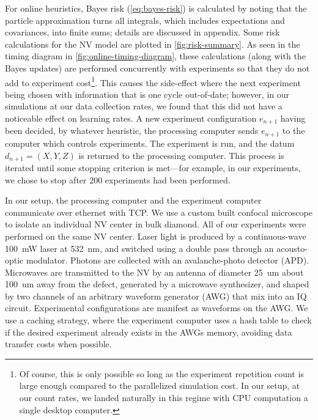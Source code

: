 \documentclass[aps,nofootinbib,twocolumn,superscriptaddress]{revtex4}
\newcommand{\eps}{e}
\newcommand{\data}{d}
\begin{document}
For online heuristics, Bayes risk (\autoref{eq:bayes-risk}) 
is calculated by noting that the 
particle approximation turns all integrals, which includes
expectations and covariances, into finite sums;
details are discussed in appendix\TODO.
Some risk calculations for the NV model 
are plotted in \autoref{fig:risk-summary}.
As seen in the timing diagram in \autoref{fig:online-timing-diagram}, these 
calculations (along with the Bayes updates) are
performed concurrently with experiments so that they do not 
add to experiment cost\footnote{Of course, this is only
possible so long as the experiment repetition count is large 
enough compared to the parallelized simulation cost. In our setup, at
our count rates, we landed naturally in this regime with
CPU computation a single desktop computer.}.
This causes the side-effect where the next experiment being chosen with
information that is one cycle out-of-date; however,
in our simulations at our data collection rates,
we found that this did not have a noticeable
effect on learning rates.
A new experiment configuration $\eps_{n+1}$ having been 
decided, by whatever heuristic, 
the processing computer sends $\eps_{n+1}$ to the 
computer which controls experiments.
The experiment is run, and the datum $\data_{n+1}=(X,Y,Z)$
is returned to the processing computer.
This process is iterated until some stopping criterion is met---for
example, in our experiments, we chose to 
stop after 200 experiments had been performed.

In our setup, the processing computer and the experiment
computer communicate over ethernet with TCP.
We use a custom built confocal microscope to isolate an individual
NV center in bulk diamond.
All of our experiments were performed on the same NV center.
Laser light is produced by a continuous-wave \SI{100}{mW} laser
at \SI{532}{nm}, and switched using a double pass through an
acousto-optic modulator. %
Photons are collected with an avalanche-photo detector
(APD).%
Microwaves are transmitted to the NV by an antenna of 
diameter \SI{25}{um} about \SI{100}{um} away from the defect,
generated by a microwave synthesizer, and shaped by two channels of
an arbitrary waveform generator (AWG)%
that mix into an IQ circuit. %
Experimental configurations are manifest as waveforms on the AWG.
We use a caching strategy, where the experiment computer
uses a hash table to check if the desired experiment already 
exists in the AWGs memory, avoiding data transfer costs when possible.
\end{document}
